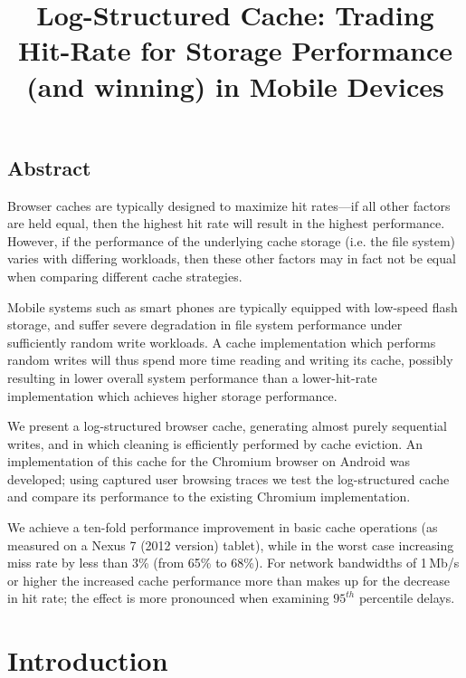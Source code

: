 \documentclass[letterpaper,twocolumn,10pt]{article}
\begin{document}
\title{\Large \bf Log-Structured Cache: Trading Hit-Rate for Storage Performance
  (and winning) in Mobile Devices}

\date{}
\maketitle

\thispagestyle{empty}

\subsection*{Abstract}
Browser caches are typically designed to maximize hit rates---if all other
factors are held equal, then the highest hit rate will result in the highest
performance. However, if the performance of the underlying cache storage
(i.e. the file system) varies with differing workloads, then these other factors
may in fact not be equal when comparing different cache strategies.

Mobile systems such as smart phones are typically equipped with low-speed flash
storage, and suffer severe degradation in file system performance under
sufficiently random write workloads. A cache implementation which performs
random writes will thus spend more time reading and writing its cache, possibly
resulting in lower overall system performance than a lower-hit-rate
implementation which achieves higher storage performance.

We present a log-structured browser cache, generating almost purely sequential
writes, and in which cleaning is efficiently performed by cache eviction. An
implementation of this cache for the Chromium browser on Android was developed;
using captured user browsing traces we test the log-structured cache and compare
its performance to the existing Chromium implementation.

We achieve a ten-fold performance improvement in basic cache operations (as
measured on a Nexus 7 (2012 version) tablet), while in the worst case
increasing miss rate by less than 3\% (from 65\% to 68\%). For network
bandwidths of 1\,Mb/s or higher the increased cache performance more than makes
up for the decrease in hit rate; the effect is more pronounced when examining
$95^{th}$ percentile delays.

\section{Introduction}
\end{document}
